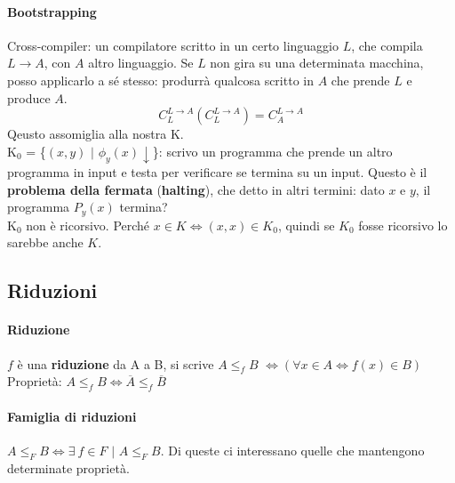 \documentclass[10pt]{book}
\begin{document}
\paragraph{Bootstrapping} Cross-compiler: un compilatore scritto in un certo linguaggio $L$, che compila $L \rightarrow A$, con $A$ altro linguaggio. Se $L$ non gira su una determinata macchina, posso applicarlo a sé stesso: produrrà qualcosa scritto in $A$ che prende $L$ e produce $A$.\\
$$C_L^{L\rightarrow A} (C_L^{L\rightarrow A})= C_A^{L\rightarrow A}$$
Qeusto assomiglia alla nostra K.\\
K$_0$ = \{$(x, y)$ $|$ $\phi_y(x)\downarrow$\}: scrivo un programma che prende un altro programma in input e testa per verificare se termina su un input. Questo è il \textbf{problema della fermata} (\textbf{halting}), che detto in altri termini: dato $x$ e $y$, il programma $P_y(x)$ termina?\\
K$_0$ non è ricorsivo. Perché $x \in K \Leftrightarrow (x, x) \in K_0$, quindi se $K_0$ fosse ricorsivo lo sarebbe anche $K$.
\subsection{Riduzioni}
\paragraph{Riduzione} $f$ è una \textbf{riduzione} da A a B, si scrive $A \leq_f B$ $\Leftrightarrow (\forall x \in A \Leftrightarrow f(x) \in B)$\\
Proprietà: $A \leq_f B \Leftrightarrow \overline{A} \leq_f \overline{B}$
\paragraph{Famiglia di riduzioni} $A \leq_F B \Leftrightarrow \exists\:f \in F$ $|$ $A \leq_F B$. Di queste ci interessano quelle che mantengono determinate proprietà.
\end{document}
